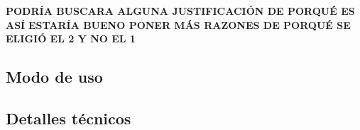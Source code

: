 \documentclass[a4paper]{article}
\begin{document}
\begin{center}
	\textbf{PODRÍA BUSCARA ALGUNA JUSTIFICACIÓN DE PORQUÉ ES ASÍ}
	\textbf{ESTARÍA BUENO PONER MÁS RAZONES DE PORQUÉ SE ELIGIÓ EL 2 Y NO EL 1}
\end{center}

\subsection{Modo de uso}


\subsection{Detalles técnicos}

\end{document}
